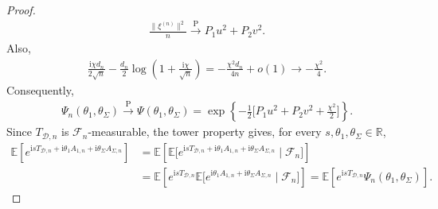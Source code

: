 \documentclass[11pt,onecolumn]{IEEEtran}
\newcommand{\nn}{\nonumber}
\newcommand{\calD}{\mathcal{D}}
\newcommand{\calF}{\mathcal{F}}
\newcommand{\rmi}{\mathrm{i}}
\newcommand{\rmP}{\mathrm{P}}
\newcommand{\bbE}{\mathbb{E}}
\newcommand{\bbR}{\mathbb{R}}
\begin{document}
\begin{proof}
    \begin{align}
        \frac{\|\xi^{(n)}\|^2}{n}\xrightarrow{\rmP}P_1u^2+P_2v^2.
    \end{align}
    Also, 
    \begin{align}
        \frac{\rmi \chi d_n}{2\sqrt{n}}-\frac{d_n}{2}\log\left(1+\frac{\rmi\chi}{\sqrt{n}} \right)= -\frac{\chi^2 d_n}{4n}+o(1)\to -\frac{\chi^2}{4}.
    \end{align}
    Consequently, 
    \begin{align}
         \Psi_n(\theta_1,\theta_\Sigma)\xrightarrow{\rmP} \Psi(\theta_1,\theta_\Sigma) = \exp\left\{ -\frac{1}{2}\bigg[P_1 u^2 + P_2v^2 + \frac{\chi^2}{2}\bigg] \right\}. \label{eqn:Psi_def}
    \end{align}
Since \(T_{\calD,n}\) is \(\calF_n\)-measurable, the tower property gives,
for every \(s,\theta_1,\theta_\Sigma\in\bbR\),
\begin{align}
 \bbE\left[
e^{ 
\rmi sT_{\calD,n}
+\rmi\theta_1 A_{1,n}
+\rmi\theta_\Sigma A_{\Sigma,n}}
\right]  & =
\bbE\left[
\bbE \big[
e^{ \rmi sT_{\calD,n}
+\rmi\theta_1 A_{1,n}
+\rmi\theta_\Sigma A_{\Sigma,n}
 }
\mid\calF_n
 \big]
\right] \nn\\
&=
\bbE\left[
e^{\rmi sT_{\calD,n}}
\bbE \big[
e^{ 
\rmi\theta_1 A_{1,n}
+\rmi\theta_\Sigma A_{\Sigma,n}
}
\mid\calF_n
 \big]
\right]  =
\bbE\left[
e^{\rmi sT_{\calD,n}}
\Psi_n(\theta_1,\theta_\Sigma)
\right].
\label{eqn:tower-cf}
\end{align}


\end{proof}
\end{document}

